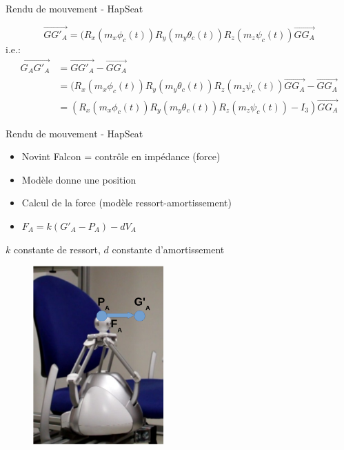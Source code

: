 \begin{frame}{Rendu de mouvement - HapSeat}

\begin{equation}
\overrightarrow{GG'_A} = (R_x(m_x \phi_c(t)) R_y(m_y \theta_c(t)) R_z(m_z \psi_c(t))\overrightarrow{GG_A}
\end{equation}
i.e.:
\begin{subequations}
\begin{align}
\overrightarrow{G_AG'_A}& = \overrightarrow{GG'_A} - \overrightarrow{GG_A}\\
&=(R_x(m_x \phi_c(t)) R_y(m_y \theta_c(t)) R_z(m_z \psi_c(t))\overrightarrow{GG_A} - \overrightarrow{GG_A}\\
&=(R_x(m_x \phi_c(t)) R_y(m_y \theta_c(t)) R_z(m_z \psi_c(t))-I_3)\overrightarrow{GG_A}
\end{align}
\end{subequations}

\end{frame}
 
\begin{frame}{Rendu de mouvement - HapSeat}
\begin{multicols}{2}
\begin{itemize}
\item Novint Falcon = contrôle en impédance (force)
\item Modèle donne une position
\item Calcul de la force (modèle ressort-amortissement)
\item $F_A = k(G'_A - P_A) - d V_A$
\end{itemize}
\footnotesize{$k$ constante de ressort, $d$ constante d'amortissement}

\begin{figure}
\centering
\includegraphics[width=5cm]{images/falcon}
\end{figure}


\end{multicols}
\end{frame}